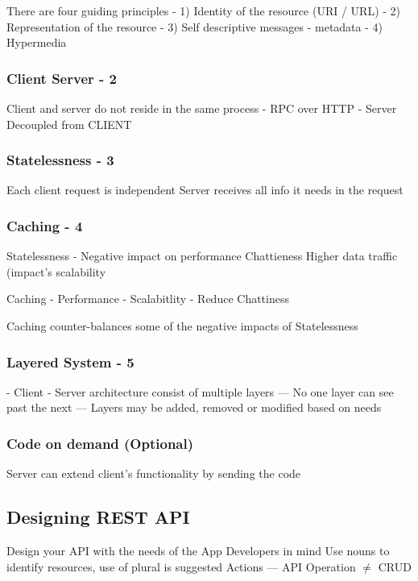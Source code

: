 \documentclass[a4paper, 11pt]{book}
\begin{document}
    There are four guiding principles
    - 1) Identity of the resource (URI / URL)
    - 2) Representation of the resource
    - 3) Self descriptive messages - metadata
    - 4) Hypermedia

    \subsubsection{Client Server - 2}
    Client and server do not reside in the same process
    - RPC over HTTP
    - Server Decoupled from CLIENT

    \subsubsection{Statelessness - 3}
    Each client request is independent
    Server receives all info it needs in the request

    \subsubsection{Caching - 4}
    Statelessness - Negative impact on performance
                    Chattieness
                    Higher data traffic (impact's scalability

    Caching - Performance
            -   Scalabitlity
            -   Reduce Chattiness

    Caching counter-balances some of the negative impacts of Statelessness

    \subsubsection{Layered System - 5}
    - Client - Server architecture consist of multiple layers
    --- No one layer can see past the next
    --- Layers may be added, removed or modified based on needs

    \subsubsection{Code on demand (Optional)}
    Server can extend client's functionality by sending the code

    \subsection{Designing REST API}
    Design your API with the needs of the App Developers in mind
    Use nouns to identify resources, use of plural is suggested
    Actions
    --- API Operation $ \neq $ CRUD
    
\end{document}
